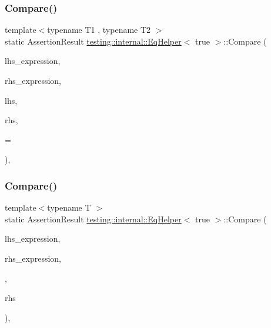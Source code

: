 \subsubsection{\texorpdfstring{Compare()}{Compare()}\hspace{0.1cm}{\footnotesize\ttfamily [1/2]}}
{\footnotesize\ttfamily template$<$typename T1 , typename T2 $>$ \\
static Assertion\+Result \mbox{\hyperlink{classtesting_1_1internal_1_1_eq_helper}{testing\+::internal\+::\+Eq\+Helper}}$<$ true $>$\+::Compare (\begin{DoxyParamCaption}\item[{const char $\ast$}]{lhs\+\_\+expression,  }\item[{const char $\ast$}]{rhs\+\_\+expression,  }\item[{const T1 \&}]{lhs,  }\item[{const T2 \&}]{rhs,  }\item[{typename \mbox{\hyperlink{structtesting_1_1internal_1_1_enable_if}{Enable\+If}}$<$!\mbox{\hyperlink{structtesting_1_1internal_1_1is__pointer}{is\+\_\+pointer}}$<$ T2 $>$\+::\mbox{\hyperlink{_obj__test_2lib_2googletest-master_2googlemock_2test_2gmock-matchers__test_8cc_a337b8a670efc0b086ad3af163f3121b6}{value}} $>$\+::type $\ast$}]{ = {} }\end{DoxyParamCaption})\hspace{0.3cm}{\ttfamily [inline]}, {\ttfamily [static]}}

\mbox{\label{classtesting_1_1internal_1_1_eq_helper_3_01true_01_4_a6f292601a68c8f0d49e6d48bd309b900}} 
\subsubsection{\texorpdfstring{Compare()}{Compare()}\hspace{0.1cm}{\footnotesize\ttfamily [2/2]}}
{\footnotesize\ttfamily template$<$typename T $>$ \\
static Assertion\+Result \mbox{\hyperlink{classtesting_1_1internal_1_1_eq_helper}{testing\+::internal\+::\+Eq\+Helper}}$<$ true $>$\+::Compare (\begin{DoxyParamCaption}\item[{const char $\ast$}]{lhs\+\_\+expression,  }\item[{const char $\ast$}]{rhs\+\_\+expression,  }\item[{Secret $\ast$}]{,  }\item[{T $\ast$}]{rhs }\end{DoxyParamCaption})\hspace{0.3cm}{\ttfamily [inline]}, {\ttfamily [static]}}




